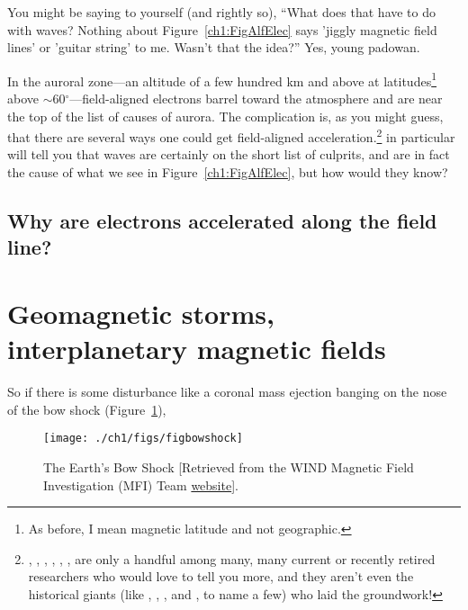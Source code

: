 You might be saying to yourself (and rightly so), ``What does that
have to do with \Alf waves? Nothing about Figure~\ref{ch1:FigAlfElec}
says 'jiggly magnetic field lines' or 'guitar string' to me. Wasn't
that the idea?'' Yes, young padowan. 

In the auroral zone---an altitude of a few hundred km and above at
latitudes\footnote{As before, I mean magnetic latitude and not
  geographic.}  above $\sim$60$^\circ$---field-aligned electrons
barrel toward the atmosphere and are near the top of the list of
causes of aurora. The complication is, as you might guess, that there
are several ways one could get field-aligned
acceleration.\footnote{\citet{Wygant2002}, \citet{Bostrom2003a},
  \citet{Morooka2004}, \citet{Newell2009}, \citet{Hull2010},
  \citet{Mottez2016}, are only a handful among many, many current or
  recently retired researchers who would love to tell you more, and
  they aren't even the historical giants (like \citet{Knight1973},
  \citet{Evans1974}, \citet{Hasegawa1976}, and \citet{Lyons1980a}, to
  name a few) who laid the groundwork!}
\citet{Chaston2002,Chaston2003a,Chaston2007,Chaston2008} in particular
will tell you that \Alf waves are certainly on the short list of
culprits, and are in fact the cause of what we see in
Figure~\ref{ch1:FigAlfElec}, but how would they know?

\subsection{Why are electrons accelerated along the field line?}



\section{Geomagnetic storms, interplanetary magnetic fields}

So if there is some disturbance
like a coronal mass ejection banging on the nose of the bow shock
(Figure~\ref{ch1:FigBowShock}),


\begin{figure}
  \centering
  \noindent\texttt{[image: ./ch1/figs/figbowshock]}
  \caption[The Earth's Bow Shock]{The Earth's Bow Shock [Retrieved
    from the WIND Magnetic Field Investigation (MFI) Team
    \href{https://wind.nasa.gov/mfi/team_sciencea.html}{website}].}
  \label{ch1:FigBowShock}
\end{figure}

